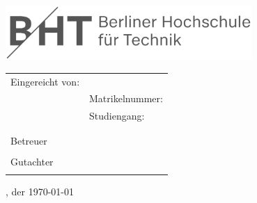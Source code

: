 \begin{titlepage}
	\begin{center}
		\begin{spacing}{1.5}
			{\Huge \bhtTitle}
		\end{spacing}
		
		\vspace*{1cm}
		
		\begin{spacing}{1.5}
			{\Large \bhtSubtitle}
		\end{spacing}
		
		\vspace*{1cm}
		{\includegraphics[width=0.7\textwidth]{images/bht_logo.eps}}
		
		\begin{spacing}{1.5}
			{\Large \bhtDocumentType}
		\end{spacing}
	\end{center}
	
	\begin{flushleft}
		\begin{tabular}{ll}
			Eingereicht von: & \bhtAuthor\\
			& Matrikelnummer: \bhtMatriculationNumber\\
			& Studiengang: \bhtCourse\\
			& \bhtUniversity\\
			& \\
			Betreuer & \bhtCaretakerFirst \\
			& \bhtCaretakerUniversityFirst \\
			Gutachter & \bhtCaretakerSecond \\
			& \bhtCaretakerUniversitySecond
		\end{tabular}
	\end{flushleft}
	
	\vspace*{1cm}
	\bhtTown, der \today
\end{titlepage}
\restoregeometry
\thispagestyle{empty}
